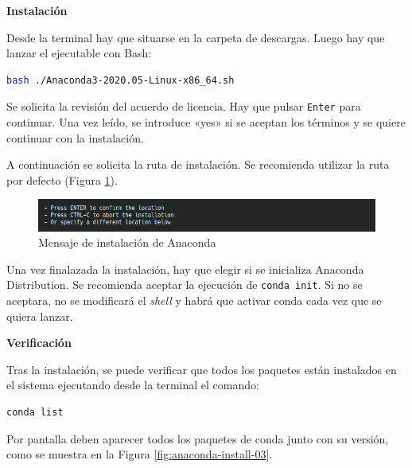 \documentclass[../main.tex]{subfiles}
\begin{document}
\textbf{Instalación}

Desde la terminal hay que situarse en la carpeta de descargas. Luego hay que lanzar el ejecutable con Bash:

\begin{lstlisting}[language=bash]
	bash ./Anaconda3-2020.05-Linux-x86_64.sh
\end{lstlisting}

Se solicita la revisión del acuerdo de licencia. Hay que pulsar \texttt{Enter} para continuar. Una vez leído, se introduce «yes» si se aceptan los términos y se quiere continuar con la instalación.

A continuación se solicita la ruta de instalación. Se recomienda utilizar la ruta por defecto (Figura \ref{fig:anaconda-install-02}).

\begin{figure}[h]
	\centering
	\includegraphics[width=0.7\linewidth]{../images/anaconda-install-02}
	\caption{Mensaje de instalación de Anaconda}
	\label{fig:anaconda-install-02}
\end{figure}

Una vez finalazada la instalación, hay que elegir si se inicializa Anaconda Distribution. Se recomienda aceptar la ejecución de \texttt{conda init}. Si no se aceptara, no se modificará el \textit{shell} y habrá que activar conda cada vez que se quiera lanzar.

\textbf{Verificación}

Tras la instalación, se puede verificar que todos los paquetes están instalados en el sistema ejecutando desde la terminal el comando:

\begin{lstlisting}[language=bash]
	conda list
\end{lstlisting}

Por pantalla deben aparecer todos los paquetes de conda junto con su versión, como se muestra en la Figura \ref{fig:anaconda-install-03}.
\end{document}
